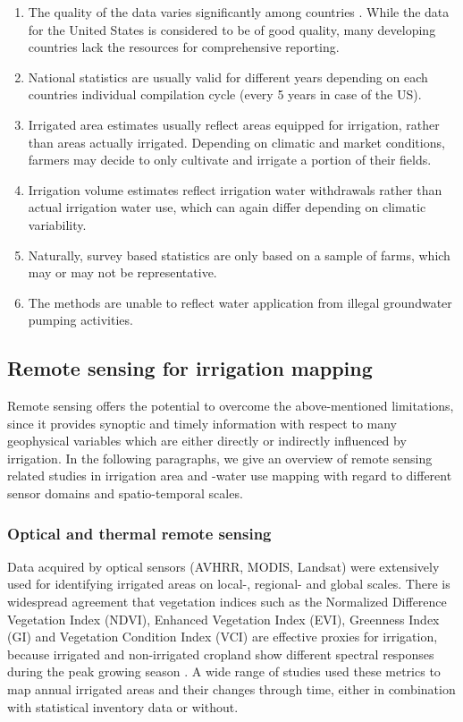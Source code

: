 \documentclass[hess, manuscript]{copernicus}
\begin{document}
\begin{enumerate}
\item The quality of the data varies significantly among countries \citep{Siebert2010}. While the data for the United States is considered to be of good quality, many developing countries lack the resources for comprehensive reporting. 
\item National statistics are usually valid for different years depending on each countries individual compilation cycle (every 5 years in case of the US).
\item Irrigated area estimates usually reflect areas equipped for irrigation, rather than areas actually irrigated. Depending on climatic and market conditions, farmers may decide to only cultivate and irrigate a portion of their fields.
\item Irrigation volume estimates reflect irrigation water withdrawals rather than actual irrigation water use, which can again differ depending on climatic variability.
\item Naturally, survey based statistics are only based on a sample of farms, which may or may not be representative.
\item The methods are unable to reflect water application from illegal groundwater pumping activities.
\end{enumerate}

\subsection{Remote sensing for irrigation mapping}
Remote sensing offers the potential to overcome the above-mentioned limitations, since it provides synoptic and timely information with respect to many geophysical variables which are either directly or indirectly influenced by irrigation. In the following paragraphs, we give an overview of remote sensing related studies in irrigation area and -water use mapping with regard to different sensor domains and spatio-temporal scales.

\subsubsection{Optical and thermal remote sensing}
Data acquired by optical sensors (AVHRR, MODIS, Landsat) were extensively used for identifying irrigated areas on local-, regional- and global scales. There is widespread agreement that vegetation indices such as the Normalized Difference Vegetation Index (NDVI), Enhanced Vegetation Index (EVI), Greenness Index (GI) and Vegetation Condition Index (VCI) are effective proxies for irrigation, because irrigated and non-irrigated cropland show different spectral responses during the peak growing season \citep{Ozdogan_2010_2}. A wide range of studies used these metrics to map annual irrigated areas and their changes through time, either in combination with statistical inventory data or without.\\
\end{document}
